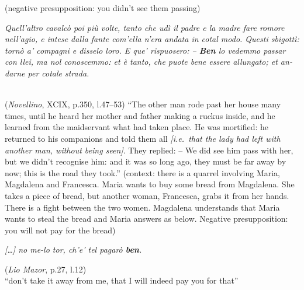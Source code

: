 \documentclass[output=paper]{langsci/langscibook}
\begin{document}
	(negative presupposition: you didn’t see them passing)\\
    \begin{otherlanguage}{italian}\emph{Quell’altro cavalcò poi più volte, tanto che udì il
    padre e la madre fare romore nell’agio, e intese dalla fante com'ella
    n’era andata in cotal modo. Questi sbigottì: tornò a’ compagni e disselo
    loro. E que’ rispuosero: – \textbf{Ben} lo vedemmo passar con llei, ma nol
    conoscemmo: et è tanto, che puote bene essere allungato; et andarne per cotale
    strada.}\end{otherlanguage}\\
	(\emph{Novellino}, XCIX, p.350, l.47--53)\hfill
    \enquote{The other man rode past her house many times, until he heard her
    mother and father making a ruckus inside, and he learned from the
    maidservant what had taken place. He was mortified: he returned to his
    companions and told them all \emph{[i.e.\ that the lady had left with
    another man, without being seen]}. They replied: -- We did see him pass
    with her, but we didn’t recognise him: and it was so long ago, they
    must be far away by now; this is the road they took.}
\ex \label{ex:schifano:12.11}
    (context: there is a quarrel involving Maria, Magdalena and Francesca.
    Maria wants to buy some bread from Magdalena. She takes a piece of bread,
    but another woman, Francesca, grabs it from her hands. There is a fight
    between the two women. Magdalena understands that Maria wants to steal the
    bread and Maria answers as below. Negative presupposition: you will not pay
    for the bread)\\
    \begin{otherlanguage}{italian}\emph{[\dots] no me-lo tor, ch’e’ tel pagarò
    \textbf{ben}.}\end{otherlanguage}\hfill
	(\emph{Lio Mazor}, p.27, l.12)\\
    \enquote{don’t take it away from me, that I will indeed pay you for that}
\z
\end{document}
